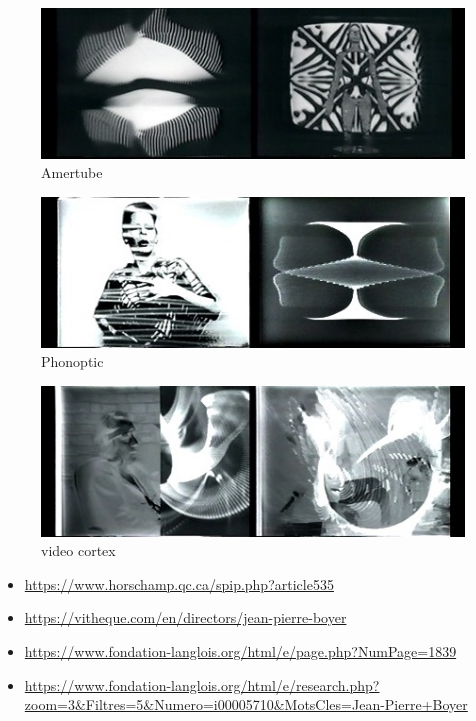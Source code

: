 \documentclass[
  french,
]{book}
\providecommand{\tightlist}{%
  \setlength{\itemsep}{0pt}\setlength{\parskip}{0pt}}
\begin{document}
\begin{figure}
\centering
\includegraphics{medias/corpus/boyer/L-Amertube-2f5ae.jpg}
\caption{Amertube}
\end{figure}

\begin{figure}
\centering
\includegraphics{medias/corpus/boyer/Phonoptic-33bd2.jpg}
\caption{Phonoptic}
\end{figure}

\begin{figure}
\centering
\includegraphics{medias/corpus/boyer/Video-Cortex-b8d37.jpg}
\caption{video cortex}
\end{figure}

\begin{itemize}
\tightlist
\item
  \url{https://www.horschamp.qc.ca/spip.php?article535}
\item
  \url{https://vitheque.com/en/directors/jean-pierre-boyer}
\item
  \url{https://www.fondation-langlois.org/html/e/page.php?NumPage=1839}
\item
  \url{https://www.fondation-langlois.org/html/e/research.php?zoom=3\&Filtres=5\&Numero=i00005710\&MotsCles=Jean-Pierre+Boyer}
\end{itemize}
\end{document}
